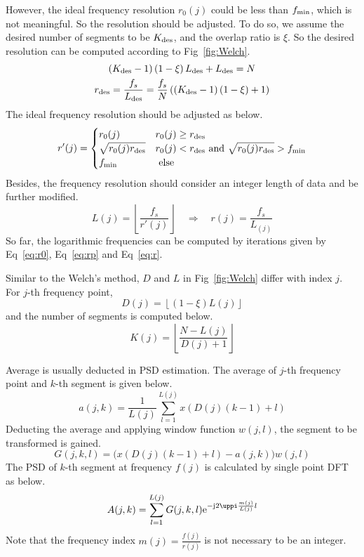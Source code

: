 However, the ideal frequency resolution $r_0(j)$ could be less than $f_{\rm min}$, which is not meaningful. So the resolution should be adjusted. To do so, we assume the desired number of segments to be $K_{\rm des}$, and the overlap ratio is $\xi$. So the desired resolution can be computed according to Fig~\ref{fig:Welch}.
\begin{gather}
    \left(K_{\rm des}-1\right) \left(1-\xi\right) L_{\rm des} + L_{\rm des} = N \\
    r_{\rm des} = \frac{f_s}{L_{\rm des}} = \frac{f_s}{N}\left(\left(K_{\rm des}-1\right) \left(1-\xi\right)+1\right)
\end{gather}
The ideal frequency resolution should be adjusted as below.
\begin{equation}
    r'(j) = \begin{cases}
        r_0(j) & r_0(j) \ge r_{\rm des} \\
        \sqrt{r_0(j)r_{\rm des}} & r_0(j) < r_{\rm des} \text{ and } \sqrt{r_0(j)r_{\rm des}} > f_{\rm min}  \\
        f_{\rm min} & \text{ else }
       \end{cases}  \label{eq:rp}
\end{equation}
Besides, the frequency resolution should consider an integer length of data and be further modified.
\begin{equation}
    L(j) = \left\lfloor \frac{f_s}{r'(j)} \right\rfloor \quad \Rightarrow \quad r(j) = \frac{f_s}{L_(j)} \label{eq:r}
\end{equation}
So far, the logarithmic frequencies can be computed by iterations given by Eq~\eqref{eq:r0}, Eq~\eqref{eq:rp} and Eq~\eqref{eq:r}. 


Similar to the Welch's method, $D$ and $L$ in Fig~\ref{fig:Welch} differ with index $j$. For $j$-th frequency point, 
\begin{equation}
    D(j) = \left\lfloor \left( 1-\xi \right) L(j) \right\rfloor
\end{equation}
and the number of segments is computed below.
\begin{equation}
    K(j) = \left\lfloor \frac{N-L(j)}{D(j)+1} \right\rfloor
\end{equation}


Average is usually deducted in PSD estimation. The average of $j$-th frequency point and $k$-th segment is given below.
\begin{equation}
    a(j,k) = \frac{1}{L(j)} \sum_{l=1}^{L(j)} x(D(j)(k-1)+l)
\end{equation}
Deducting the average and applying window function $w(j,l)$, the segment to be transformed is gained.
\begin{equation}
    G(j,k,l) = \big( x(D(j)(k-1)+l) - a(j,k) \big) w(j,l)
\end{equation}
The PSD of $k$-th segment at frequency $f(j)$ is calculated by single point DFT as below.
\begin{equation}
    A(j,k) = \sum_{l=1}^{L(j)} G(j,k,l) \iexp{-\mathrm{j} 2 \uppi \frac{m(j)}{L(j)} l}
\end{equation}
Note that the frequency index $m(j)=\frac{f(j)}{r(j)}$ is not necessary to be an integer.


